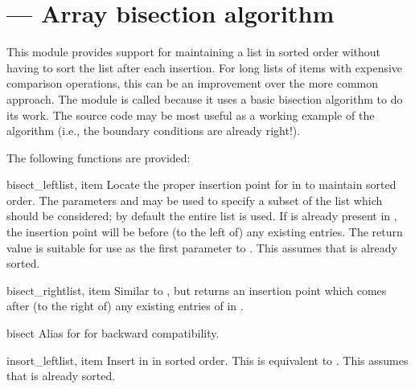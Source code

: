 \section{ ---
         Array bisection algorithm}



This module provides support for maintaining a list in sorted order
without having to sort the list after each insertion.  For long lists
of items with expensive comparison operations, this can be an
improvement over the more common approach.  The module is called
 because it uses a basic bisection algorithm to do its
work.  The source code may be most useful as a working example of the
algorithm (i.e., the boundary conditions are already right!).

The following functions are provided:

\begin{funcdesc}{bisect_left}{list, item}
  Locate the proper insertion point for  in  to
  maintain sorted order.  The parameters  and  may be
  used to specify a subset of the list which should be considered; by
  default the entire list is used.  If  is already present
  in , the insertion point will be before (to the left of)
  any existing entries.  The return value is suitable for use as the
  first parameter to .  This assumes that
   is already sorted.
\end{funcdesc}

\begin{funcdesc}{bisect_right}{list, item}
  Similar to , but returns an insertion point
  which comes after (to the right of) any existing entries of
   in .
\end{funcdesc}

\begin{funcdesc}{bisect}{\unspecified}
  Alias for  for backward compatibility.
\end{funcdesc}

\begin{funcdesc}{insort_left}{list, item}
  Insert  in  in sorted order.  This is equivalent
  to .  This assumes that  is
  already sorted.
\end{funcdesc}

